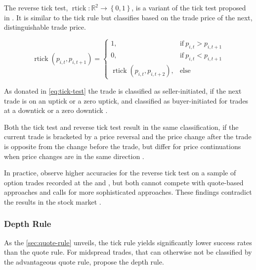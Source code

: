 The reverse tick test, $\operatorname{rtick} \colon \mathbb{R}^2 \to \left\{0, 1\right\}$, is a variant of the tick test proposed in \textcite[][241]{hasbrouckTradesQuotesInventories1988}. It is similar to the tick rule but classifies based on the trade price of the next, distinguishable trade price.

\begin{equation}
  \operatorname{rtick}(p_{i, t}, p_{i,t+1})=
  \begin{cases}
    1,                     & \text{if}\ p_{i, t} > p_{i, t+1} \\
    0,                     & \text{if}\ p_{i, t} < p_{i, t+1} \\
    \operatorname{rtick}(p_{i,t}, p_{i,t+2}), & \text{else}
  \end{cases}
  \label{eq:reverse-tick-test}
\end{equation}

As donated in \cref{eq:tick-test} the trade is classified as seller-initiated, if the next trade is on an uptick or a zero uptick, and classified as buyer-initiated for trades at a downtick or a zero downtick \autocite[][735--636]{leeInferringTradeDirection1991}.

Both the tick test and reverse tick test result in the same classification, if the current trade is bracketed by a price reversal and the price change after the trade is opposite from the change before the trade, but differ for price continuations when price changes are in the same direction \autocite[][736]{leeInferringTradeDirection1991}.

In practice, \textcite[][29--32]{grauerOptionTradeClassification2022} observe higher accuracies for the reverse tick test on a sample of option trades recorded at the  and , but both cannot compete with quote-based approaches and calls for more sophisticated approaches. These findings contradict the results in the stock market \autocite[][737]{leeInferringTradeDirection1991}.

\subsubsection{Depth Rule}\label{sec:depth-rule}

As the \cref{sec:quote-rule} unveils, the tick rule yields significantly lower success rates than the quote rule. For midspread trades, that can otherwise not be classified by the advantageous quote rule, \textcite[][14]{grauerOptionTradeClassification2022} propose the depth rule.

